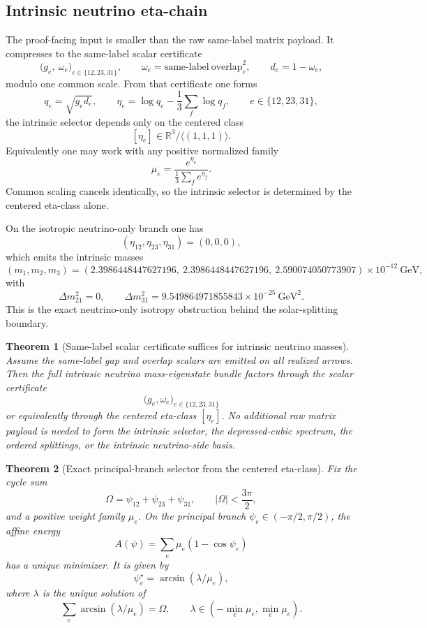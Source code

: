 \documentclass[11pt]{article}
\newtheorem{theorem}{Theorem}[section]
\begin{document}
\subsection{Intrinsic neutrino eta-chain}

The proof-facing input is smaller than the raw same-label matrix payload. It compresses to the
same-label scalar certificate
\[
\bigl(g_e,\ \omega_e\bigr)_{e\in\{12,23,31\}},
\qquad
\omega_e=\mathrm{same\text{-}label\ overlap}_e^2,
\qquad
d_e=1-\omega_e,
\]
modulo one common scale. From that certificate one forms
\[
q_e=\sqrt{g_e d_e},
\qquad
\eta_e=\log q_e-\frac13\sum_f \log q_f,
\qquad
e\in\{12,23,31\},
\]
the intrinsic selector depends only on the centered class
\[
[\eta_e]\in \mathbb{R}^3/\langle(1,1,1)\rangle.
\]
Equivalently one may work with any positive normalized family
\[
\mu_e=\frac{e^{\eta_e}}{\frac13\sum_f e^{\eta_f}}.
\]
Common scaling cancels identically, so the intrinsic selector is determined by the centered
eta-class alone.

On the isotropic neutrino-only branch one has
\[
(\eta_{12},\eta_{23},\eta_{31})=(0,0,0),
\]
which emits the intrinsic masses
\[
(m_1,m_2,m_3)=
(2.3986448447627196,\ 2.3986448447627196,\ 2.590074050773907)\times10^{-12}\ \mathrm{GeV},
\]
with
\[
\Delta m_{21}^2=0,
\qquad
\Delta m_{31}^2=9.549864971855843\times10^{-25}\ \mathrm{GeV}^2.
\]
This is the exact neutrino-only isotropy obstruction behind the solar-splitting boundary.

\begin{theorem}[Same-label scalar certificate suffices for intrinsic neutrino masses]
Assume the same-label gap and overlap scalars are emitted on all realized arrows. Then the full
intrinsic neutrino mass-eigenstate bundle factors through the scalar certificate
\[
\bigl(g_e,\omega_e\bigr)_{e\in\{12,23,31\}}
\]
or equivalently through the centered eta-class \([\eta_e]\). No additional raw matrix payload is
needed to form the intrinsic selector, the depressed-cubic spectrum, the ordered splittings, or
the intrinsic neutrino-side basis.
\end{theorem}

\begin{theorem}[Exact principal-branch selector from the centered eta-class]
Fix the cycle sum
\[
\Omega=\psi_{12}+\psi_{23}+\psi_{31},
\qquad |\Omega|<\frac{3\pi}{2},
\]
and a positive weight family \(\mu_e\). On the principal branch
\(\psi_e\in(-\pi/2,\pi/2)\), the affine energy
\[
A(\psi)=\sum_e \mu_e(1-\cos\psi_e)
\]
has a unique minimizer. It is given by
\[
\psi_e^\star=\arcsin(\lambda/\mu_e),
\]
where \(\lambda\) is the unique solution of
\[
\sum_e \arcsin(\lambda/\mu_e)=\Omega,
\qquad
\lambda\in(-\min_e\mu_e,\min_e\mu_e).
\]
\end{theorem}
\end{document}
